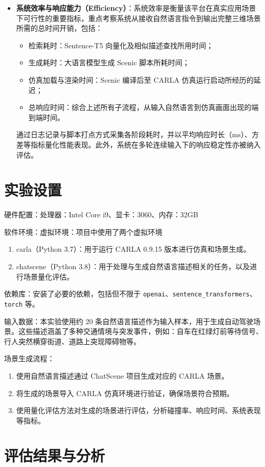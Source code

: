 \begin{itemize}
	\item \textbf{系统效率与响应能力（Efficiency）}：系统效率是衡量该平台在真实应用场景下可行性的重要指标，重点考察系统从接收自然语言指令到输出完整三维场景所需的总时间开销，包括：
	\begin{itemize}
		\item 检索耗时：Sentence-T5 向量化及相似描述查找所用时间；
		\item 生成耗时：大语言模型生成 Scenic 脚本所耗时间；
		\item 仿真加载与渲染时间：Scenic 编译后至 CARLA 仿真运行启动所经历的延迟；
		\item 总响应时间：综合上述所有子流程，从输入自然语言到仿真画面出现的端到端时间。
	\end{itemize}
	通过日志记录与脚本打点方式采集各阶段耗时，并以平均响应时长（ms）、方差等指标量化性能表现。此外，系统在多轮连续输入下的响应稳定性亦被纳入评估。
\end{itemize}

\section{实验设置}
硬件配置：处理器：Intel Core i9、显卡：3060、内存：32GB

软件环境：虚拟环境：项目中使用了两个虚拟环境
\begin{enumerate}
	\item carla（Python 3.7）：用于运行 CARLA 0.9.15 版本进行仿真和场景生成。
	\item chatscene（Python 3.8）：用于处理与生成自然语言描述相关的任务，以及进行场景量化评估。
\end{enumerate}
依赖库：安装了必要的依赖，包括但不限于 \texttt{openai}、\texttt{sentence\_transformers}、\texttt{torch} 等。

输入数据：本实验使用约 20 条自然语言描述作为输入样本，用于生成自动驾驶场景。这些描述涵盖了多种交通情境与突发事件，例如：自车在红绿灯前等待信号、行人突然横穿街道、道路上突现障碍物等。


场景生成流程：
\begin{enumerate}
	\item 使用自然语言描述通过 ChatScene 项目生成对应的 CARLA 场景。
	\item 将生成的场景导入 CARLA 仿真环境进行验证，确保场景符合预期。
	\item 使用量化评估方法对生成的场景进行评估，分析碰撞率、响应时间、系统表现等指标。
\end{enumerate}

\section{评估结果与分析}

